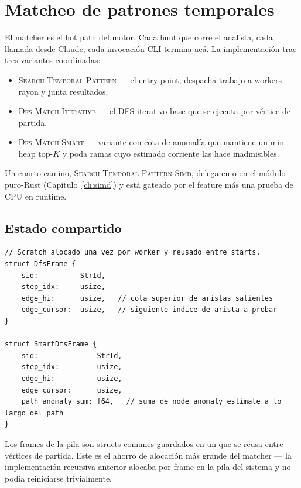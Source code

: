 \chapter{Matcheo de patrones temporales}
\label{ch:matcher}

El matcher es el hot path del motor. Cada hunt que corre el
analista, cada llamada  desde Claude, cada
invocación CLI termina acá. La implementación trae tres variantes
coordinadas:

\begin{itemize}
    \item \textsc{Search-Temporal-Pattern} --- el entry point;
        despacha trabajo a workers rayon y junta resultados.
    \item \textsc{Dfs-Match-Iterative} --- el DFS iterativo base
        que se ejecuta por vértice de partida.
    \item \textsc{Dfs-Match-Smart} --- variante con cota de
        anomalía que mantiene un min-heap top-$K$ y poda ramas
        cuyo estimado corriente las hace inadmisibles.
\end{itemize}

Un cuarto camino, \textsc{Search-Temporal-Pattern-Simd}, delega
en  o en el módulo puro-Rust 
(Capítulo~\ref{ch:simd}) y está gateado por el feature 
más una prueba de CPU en runtime.

\section{Estado compartido}

\begin{lstlisting}[style=rust]
// Scratch alocado una vez por worker y reusado entre starts.
struct DfsFrame {
    sid:          StrId,
    step_idx:     usize,
    edge_hi:      usize,   // cota superior de aristas salientes
    edge_cursor:  usize,   // siguiente indice de arista a probar
}

struct SmartDfsFrame {
    sid:              StrId,
    step_idx:         usize,
    edge_hi:          usize,
    edge_cursor:      usize,
    path_anomaly_sum: f64,   // suma de node_anomaly_estimate a lo largo del path
}
\end{lstlisting}

Los frames de la pila son structs comunes guardados en un
 que se reusa entre vértices de partida. Este es
el ahorro de alocación más grande del matcher --- la
implementación recursiva anterior alocaba por frame en la pila
del sistema y no podía reiniciarse trivialmente.

